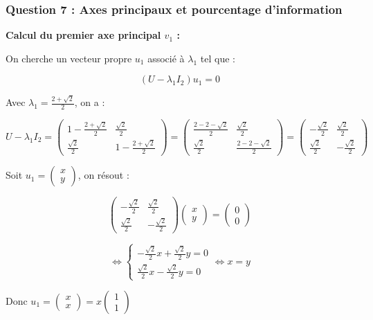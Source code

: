 \documentclass[11pt,a4paper]{article}
\begin{document}
\subsubsection{Question 7 : Axes principaux et pourcentage d'information}

\textbf{Calcul du premier axe principal $v_1$ :}

On cherche un vecteur propre $u_1$ associé à $\lambda_1$ tel que :

$$(U - \lambda_1 I_2) u_1 = 0$$

Avec $\lambda_1 = \frac{2 + \sqrt{2}}{2}$, on a :

$$U - \lambda_1 I_2 = \begin{pmatrix}
1 - \frac{2 + \sqrt{2}}{2} & \frac{\sqrt{2}}{2} \\
\frac{\sqrt{2}}{2} & 1 - \frac{2 + \sqrt{2}}{2}
\end{pmatrix} = \begin{pmatrix}
\frac{2 - 2 - \sqrt{2}}{2} & \frac{\sqrt{2}}{2} \\
\frac{\sqrt{2}}{2} & \frac{2 - 2 - \sqrt{2}}{2}
\end{pmatrix} = \begin{pmatrix}
-\frac{\sqrt{2}}{2} & \frac{\sqrt{2}}{2} \\
\frac{\sqrt{2}}{2} & -\frac{\sqrt{2}}{2}
\end{pmatrix}$$

Soit $u_1 = \begin{pmatrix} x \\ y \end{pmatrix}$, on résout :

$$\begin{pmatrix}
-\frac{\sqrt{2}}{2} & \frac{\sqrt{2}}{2} \\
\frac{\sqrt{2}}{2} & -\frac{\sqrt{2}}{2}
\end{pmatrix} \begin{pmatrix} x \\ y \end{pmatrix} = \begin{pmatrix} 0 \\ 0 \end{pmatrix}$$

$$\Leftrightarrow \begin{cases}
-\frac{\sqrt{2}}{2}x + \frac{\sqrt{2}}{2}y = 0 \\
\frac{\sqrt{2}}{2}x - \frac{\sqrt{2}}{2}y = 0
\end{cases} \Leftrightarrow x = y$$

Donc $u_1 = \begin{pmatrix} x \\ x \end{pmatrix} = x \begin{pmatrix} 1 \\ 1 \end{pmatrix}$
\end{document}
